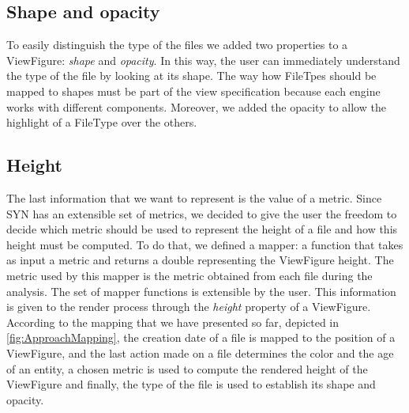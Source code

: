 \subsection*{Shape and opacity}
To easily distinguish the type of the files we added two properties to a ViewFigure: \textit{shape} and \textit{opacity}. 
In this way, the user can immediately understand the type of the file by looking at its shape. The way how FileTpes should be mapped to shapes must be part of the view specification because each engine works with different components. 
\bigbreak
Moreover, we added the opacity to allow the highlight of a FileType over the others. 

\subsection*{Height}
The last information that we want to represent is the value of a metric. Since SYN has an extensible set of metrics, we decided to give the user the freedom to decide which metric should be used to represent the height of a file and how this height must be computed. 
To do that, we defined a mapper: a function that takes as input a metric and returns a double representing the ViewFigure height. The metric used by this mapper is the metric obtained from each file during the analysis. The set of mapper functions is extensible by the user. \bigbreak
This information is given to the render process through the \textit{height} property of a ViewFigure.
\bigbreak
According to the mapping that we have presented so far, depicted in \autoref{fig:ApproachMapping}, the creation date of a file is mapped to the position of a ViewFigure, and the last action made on a file determines the color and the age of an entity, a chosen metric is used to compute the rendered height of the ViewFigure and finally, the type of the file is used to establish its shape and opacity. 


